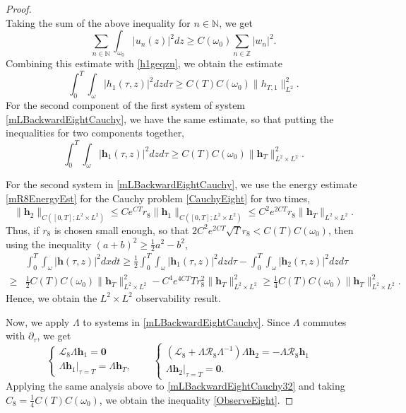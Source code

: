 \documentclass[12pt]{amsart}
\theoremstyle{remark}
\theoremstyle{definition}
\numberwithin{equation}{section}
\newcommand{\p}{\partial}
\newcommand{\N}{\mathbb{N}}
\newcommand{\f}{\frac}
\newcommand{\mL}{\mathcal{L}}
\newcommand{\mR}{\mathcal{R}}
\begin{document}
\begin{proof}
\begin{equation*}
\end{equation*}
Taking the sum of the above inequality for $n\in \N$, we get
\begin{equation*}
\sum_{n\in\mathbb{N}}\int_{\omega_0}|u_n(z)|^2dz\geq C(\omega_0)\sum_{n\in\mathbb{Z}}|w_n|^2.
\end{equation*}
Combining this estimate with \eqref{h1geqzn}, we obtain the estimate
\begin{equation*}
\int_0^T \int_\omega |h_1(\tau,z)|^2 dzd\tau \geq C(T)C(\omega_0)\|h_{T,1}\|_{L^2}^2.
\end{equation*}
For the second component of the first system of system \eqref{mLBackwardEightCauchy}, we have the same estimate, so that putting the inequalities for two components together, 
\begin{equation*}
\int_0^T \int_\omega |\mathbf{h}_1(\tau,z)|^2 dzd\tau \geq C(T)C(\omega_0)\|\mathbf{h}_{T}\|_{L^2\times L^2}^2.
\end{equation*}

For the second system in \eqref{mLBackwardEightCauchy}, we use the energy estimate \eqref{mR8EnergyEst} for the Cauchy problem \eqref{CauchyEight} for two times, 
\begin{equation*} 
 \| \mathbf{h}_2\|_{C([0,T]; L^2\times L^2)} \leq Ce^{CT}r_8 \| \mathbf{h}_1\|_{C([0,T]; L^2\times L^2)}\leq C^2e^{2CT}r_8\|\mathbf{h}_T\|_{L^2\times L^2}.   
\end{equation*}
Thus, if $r_8$ is chosen small enough, so that $2C^2e^{2CT}\sqrt{T}r_8<C(T)C(\omega_0)$, then using the inequality $(a+b)^2 \geq \f12 a^2 - b^2$,
\begin{align*}
&\int_0^T \int_\omega |\mathbf{h}(\tau,z)|^2 dxdt \geq \f12 \int_0^T \int_\omega |\mathbf{h}_1(\tau,z)|^2 dzd\tau-\int_0^T \int_\omega |\mathbf{h}_2(\tau,z)|^2 dzd\tau \\
\geq& \f12
C(T)C(\omega_0) \| \mathbf{h}_{T}\|_{L^2\times L^2}^2-C^4e^{4CT}Tr^2_8\| \mathbf{h}_{T}\|^2_{L^2\times L^2} \geq \f14C(T)C(\omega_0) \| \mathbf{h}_{T}\|_{L^2\times L^2}^2.
\end{align*}
Hence, we obtain the $L^2\times L^2$ observability result.

Now, we apply $\Lambda$ to systems in \eqref{mLBackwardEightCauchy}.
Since $\Lambda$ commutes with $\p_\tau$, we get 
\begin{equation} \label{mLBackwardEightCauchy32}
\left\{
\begin{array}{lr}
\mL_8 \Lambda\mathbf{h}_1 = \mathbf{0} &  \\
\Lambda\mathbf{h}_1|_{\tau=T} = \Lambda\mathbf{h}_T,&
\end{array}
\right. \quad
\left\{
\begin{array}{lr}
(\mL_8 + \Lambda\mR_8\Lambda^{-1})\Lambda\mathbf{h}_2 = -\Lambda\mR_8 \mathbf{h}_1 &  \\
\Lambda\mathbf{h}_2|_{\tau=T} = \mathbf{0}.&
\end{array}
\right.
\end{equation}
Applying the same analysis above to \eqref{mLBackwardEightCauchy32}
and taking $C_8=\f14C(T)C(\omega_0)$, we obtain the inequality \eqref{ObserveEight}. 
\end{proof}
\end{document}
